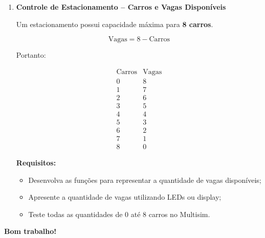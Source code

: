 \documentclass[a4paper,12pt]{article}
\begin{document}
\begin{enumerate}[leftmargin=*]
\[
001111_2 = 17_8
\]

\[
101010_2 = 52_8
\]

\[
111111_2 = 77_8
\]

\textbf{Requisitos:}

\begin{itemize}
    \item Desenvolva o conversor de 3 bits para display de 7 segmentos;
    \item Determine as funções dos segmentos
    $a,b,c,d,e,f,g$ utilizando Mapas de Karnaugh;
    \item Utilize o mesmo circuito lógico para controlar os dois displays;
    \item Utilize seis chaves digitais como entradas;
    \item Teste valores entre $000000_2$ e $111111_2$.
\end{itemize}

\vspace{0.4cm}


\item \textbf{Controle de Estacionamento -- Carros e Vagas Disponíveis}

Um estacionamento possui capacidade máxima para \textbf{8 carros}.


\[
\text{Vagas}=8-\text{Carros}
\]

Portanto:

\[
\begin{array}{c|c}
\text{Carros} & \text{Vagas} \\ \hline
0 & 8\\
1 & 7\\
2 & 6\\
3 & 5\\
4 & 4\\
5 & 3\\
6 & 2\\
7 & 1\\
8 & 0
\end{array}
\]

\textbf{Requisitos:}

\begin{itemize}
    \item Desenvolva as funções para representar a quantidade
    de vagas disponíveis;
    \item Apresente a quantidade de vagas utilizando LEDs ou display;
    \item Teste todas as quantidades de 0 até 8 carros no Multisim.
\end{itemize}

\end{enumerate}

\vfill

\begin{center}
\textbf{Bom trabalho!}
\end{center}
\end{document}
